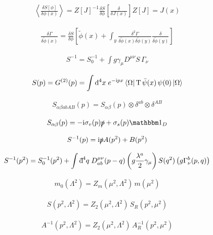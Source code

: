 \documentclass[oneside, openany]{book}
\numberwithin{equation}{chapter}
\numberwithin{figure}{chapter}
\newcommand{\ii}{\mathrm{i}}
\newcommand{\dbar}{\mathord{\mathrm{d}\mkern-8mu\raisebox{0.55em}{\rule{0.38em}{0.05em}}\mkern0.1mu}}
\newcommand{\p}[0]{\slashed{p}}
\newcommand{\g}[0]{\gamma}
\begin{document}
\begin{align}
	\left\langle \frac{\delta S[\phi]}{\delta\phi(x)} \right\rangle = Z[J]^{-1} \frac{\delta S}{\delta \phi}\left[\frac{\delta}{\delta J(x)}\right]Z[J] = J(x)
\end{align}

\begin{align}
	\frac{\delta\Gamma}{\delta\tilde\phi(x)} = \frac{\delta S}{\delta \phi}\left[\tilde\phi(x) + \int_y \frac{\delta^2 \Gamma}{\delta\tilde\phi(x)\delta\tilde\phi(y)}\frac{\delta}{\delta\tilde\phi(y)}\right]
\end{align}

\begin{align}
	S^{-1} = S_0^{-1} + \int g\g_\mu D^{\mu\nu}S \, \Gamma_\nu
\end{align}

\begin{align}
	S(p) = G^{(2)}(p) = \int \dd^4x\; e^{-\ii px}\bra{\Omega} \mathrm{T} \, \bar\psi(x)\,\psi(0)\ket{\Omega}
\end{align}

\begin{align}
	S_{\alpha\beta ab AB}(p) = S_{\alpha\beta}(p)\otimes \delta^{ab}\otimes \delta^{AB}
\end{align}

\begin{align}
	S_{\alpha\beta}(p) = -\ii\sigma_v(p) \p + \sigma_s(p) \mathbbm 1_D
\end{align}

\begin{align}
	S^{-1}(p) = \ii \p A(p^2) + B(p^2)
\end{align}

\begin{align}
	S^{-1}(p^2) = S_0^{-1}(p^2) + \int \dbar^4 q \; D_{ab}^{\mu\nu}(p-q)\left( g\frac{\lambda^a}{2}\g_\mu \right)S(q^2)\left( g\Gamma^b_\nu(p,q) \right)
\end{align}

\begin{align}
	m_0(\Lambda^2) = Z_m(\mu^2,\Lambda^2)\, m(\mu^2)
\end{align}

\begin{align}
	S(p^2,\Lambda^2) = Z_2(\mu^2, \Lambda^2)\, S_R(p^2, \mu^2)
\end{align}

\begin{align}
	A^{-1}(p^2, \Lambda^2) = Z_2(\mu^2, \Lambda^2)\, A_R^{-1}(p^2, \mu^2)
\end{align}
\end{document}

